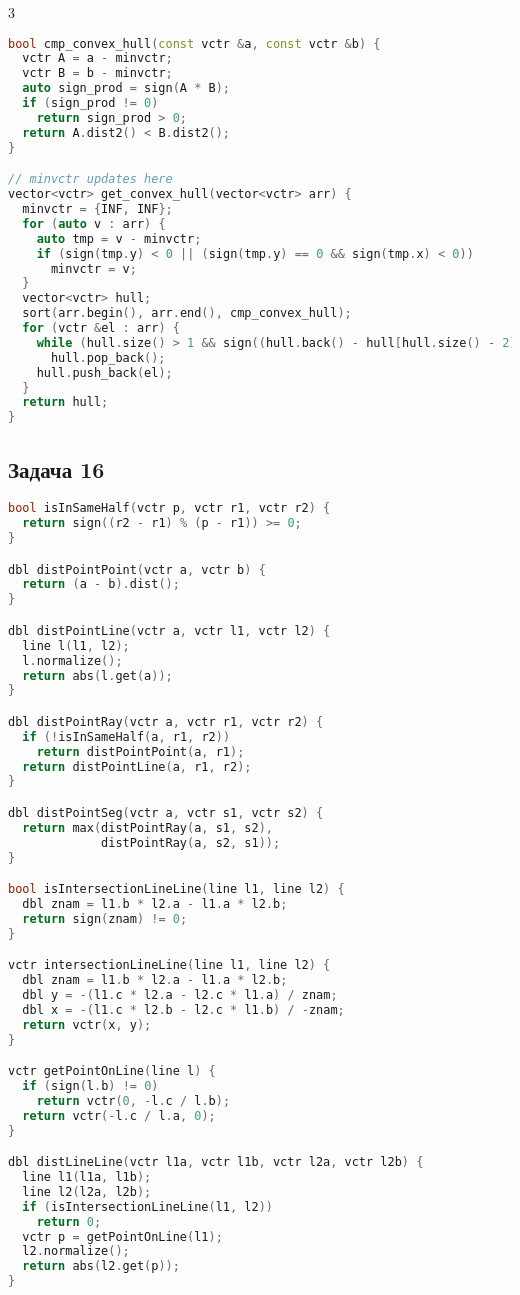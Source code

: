 \documentclass[9pt,a4paper,landscape,twosided]{extarticle}
\begin{document}
\begin{multicols*}{3}
\begin{lstlisting}[language=C++]
bool cmp_convex_hull(const vctr &a, const vctr &b) {
  vctr A = a - minvctr;
  vctr B = b - minvctr;
  auto sign_prod = sign(A * B);
  if (sign_prod != 0)
    return sign_prod > 0;
  return A.dist2() < B.dist2();
}

// minvctr updates here
vector<vctr> get_convex_hull(vector<vctr> arr) {
  minvctr = {INF, INF};
  for (auto v : arr) {
    auto tmp = v - minvctr;
    if (sign(tmp.y) < 0 || (sign(tmp.y) == 0 && sign(tmp.x) < 0))
      minvctr = v;
  }
  vector<vctr> hull;
  sort(arr.begin(), arr.end(), cmp_convex_hull);
  for (vctr &el : arr) {
    while (hull.size() > 1 && sign((hull.back() - hull[hull.size() - 2]) * (el - hull.back())) <= 0)
      hull.pop_back();
    hull.push_back(el);
  }
  return hull;
}

\end{lstlisting}

\subsection{Задача 16}
\begin{lstlisting}[language=C++]
bool isInSameHalf(vctr p, vctr r1, vctr r2) {
  return sign((r2 - r1) % (p - r1)) >= 0;
}

dbl distPointPoint(vctr a, vctr b) {
  return (a - b).dist();
}

dbl distPointLine(vctr a, vctr l1, vctr l2) {
  line l(l1, l2);
  l.normalize();
  return abs(l.get(a));
}

dbl distPointRay(vctr a, vctr r1, vctr r2) {
  if (!isInSameHalf(a, r1, r2))
    return distPointPoint(a, r1);
  return distPointLine(a, r1, r2);
}

dbl distPointSeg(vctr a, vctr s1, vctr s2) {
  return max(distPointRay(a, s1, s2),
             distPointRay(a, s2, s1));
}

bool isIntersectionLineLine(line l1, line l2) {
  dbl znam = l1.b * l2.a - l1.a * l2.b;
  return sign(znam) != 0;
}

vctr intersectionLineLine(line l1, line l2) {
  dbl znam = l1.b * l2.a - l1.a * l2.b;
  dbl y = -(l1.c * l2.a - l2.c * l1.a) / znam;
  dbl x = -(l1.c * l2.b - l2.c * l1.b) / -znam;
  return vctr(x, y);
}

vctr getPointOnLine(line l) {
  if (sign(l.b) != 0)
    return vctr(0, -l.c / l.b);
  return vctr(-l.c / l.a, 0);
}

dbl distLineLine(vctr l1a, vctr l1b, vctr l2a, vctr l2b) {
  line l1(l1a, l1b);
  line l2(l2a, l2b);
  if (isIntersectionLineLine(l1, l2))
    return 0;
  vctr p = getPointOnLine(l1);
  l2.normalize();
  return abs(l2.get(p));
}


\end{lstlisting}
\end{multicols*}
\end{document}
